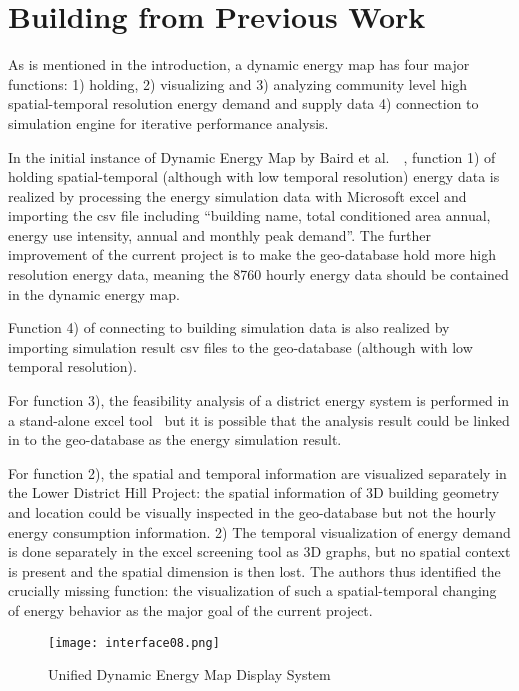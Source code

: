 
\chapter{Building from Previous Work} %

\label{Chapter3} %


As is mentioned in the introduction, a dynamic energy map has four
major functions: 1) holding, 2) visualizing and 3) analyzing community
level high spatial-temporal resolution energy demand and supply data
4) connection to simulation engine for iterative performance
analysis. 

In the initial instance of Dynamic Energy Map by Baird et al.\
~\cite{baird2014}, function 1) of holding spatial-temporal (although
with low temporal resolution) energy data is realized by processing
the energy simulation data with Microsoft excel and importing the csv
file including ``building name, total conditioned area annual, energy
use intensity, annual and monthly peak demand''. The further
improvement of the current project is to make the geo-database hold
more high resolution energy data, meaning the 8760 hourly energy data
should be contained in the dynamic energy map.

Function 4) of connecting to building simulation data is also realized
by importing simulation result csv files to the geo-database (although
with low temporal resolution).

For function 3), the feasibility analysis of a district energy system
is performed in a stand-alone excel tool~\cite{baird2014} but it is
possible that the analysis result could be linked in to the
geo-database as the energy simulation result. 

For function 2), the spatial and temporal information are visualized
separately in the Lower District Hill Project: the spatial information
of 3D building geometry and location could be visually inspected in
the geo-database but not the hourly energy consumption information. 2)
The temporal visualization of energy demand is done separately in the
excel screening tool as 3D graphs, but no spatial context is present
and the spatial dimension is then lost. The authors thus identified
the crucially missing function: the visualization of such a
spatial-temporal changing of energy behavior as the major goal of the
current project.

\begin{figure}[h!]
  \centering
  \texttt{[image: interface08.png]}
  \caption[Dynamic Energy Map Display]{Unified Dynamic Energy Map
    Display System}
  \label{fig:interface08}
\end{figure}